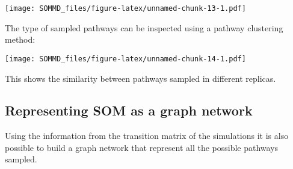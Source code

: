 \documentclass[
]{article}
\newenvironment{Shaded}{\begin{snugshade}}{\end{snugshade}}
\newcommand{\AttributeTok}[1]{\textcolor[rgb]{0.77,0.63,0.00}{#1}}
\newcommand{\CommentTok}[1]{\textcolor[rgb]{0.56,0.35,0.01}{\textit{#1}}}
\newcommand{\FunctionTok}[1]{\textcolor[rgb]{0.00,0.00,0.00}{#1}}
\newcommand{\NormalTok}[1]{#1}
\newcommand{\OtherTok}[1]{\textcolor[rgb]{0.56,0.35,0.01}{#1}}
\newcommand{\SpecialCharTok}[1]{\textcolor[rgb]{0.00,0.00,0.00}{#1}}
\newcommand{\StringTok}[1]{\textcolor[rgb]{0.31,0.60,0.02}{#1}}
\begin{document}
\texttt{[image: SOMMD\_files/figure-latex/unnamed-chunk-13-1.pdf]}

The type of sampled pathways can be inspected using a pathway clustering
method:

\begin{Shaded}
\end{Shaded}

\texttt{[image: SOMMD\_files/figure-latex/unnamed-chunk-14-1.pdf]}

This shows the similarity between pathways sampled in different
replicas.

\hypertarget{representing-som-as-a-graph-network}{%
\subsection{\texorpdfstring{\textbf{Representing SOM as a graph
network}}{Representing SOM as a graph network}}\label{representing-som-as-a-graph-network}}

Using the information from the transition matrix of the simulations it
is also possible to build a graph network that represent all the
possible pathways sampled.

\begin{Shaded}
\end{Shaded}
\end{document}
